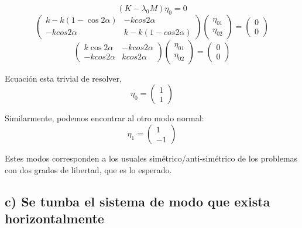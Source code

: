 \documentclass[a4paper,12pt]{article}
\begin{document}
$$(K-\lambda_0 M)\eta_0 = 0$$
\begin{equation*}
  \begin{pmatrix}
    k - k(1-\cos{2\alpha}) & -kcos{2\alpha}\\
    -kcos{2\alpha} & k - k (1-cos{2\alpha})
  \end{pmatrix}
  \begin{pmatrix}
    \eta_{01}\\
    \eta_{02}
  \end{pmatrix} = \begin{pmatrix}
    0 \\ 0
  \end{pmatrix}
\end{equation*}
\begin{equation*}
  \begin{pmatrix}
      k\cos{2\alpha} & -kcos{2\alpha}\\
    -kcos{2\alpha} &  kcos{2\alpha}
  \end{pmatrix}
  \begin{pmatrix}
    \eta_{01}\\
    \eta_{02}
  \end{pmatrix} = \begin{pmatrix}
    0 \\ 0
  \end{pmatrix}
\end{equation*}

Ecuación esta trivial de resolver, 
\begin{equation}
  \eta_0 = \begin{pmatrix}
    1\\1
  \end{pmatrix}
\end{equation}

Similarmente, podemos encontrar al otro modo normal:
\begin{equation}
  \eta_1 = \begin{pmatrix}
    1\\-1
  \end{pmatrix}
\end{equation}

Estes modos corresponden a los usuales simétrico/anti-simétrico de los problemas con dos grados de libertad, que es lo esperado.


\subsection*{c) Se tumba el sistema de modo que exista horizontalmente}
\end{document}
